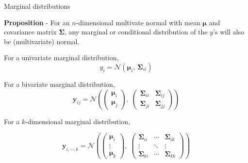 \documentclass[11pt,ignorenonframetext,]{beamer}
\begin{document}
\begin{frame}{Marginal distributions}
\protect\hypertarget{marginal-distributions}{}

\small

\textbf{Proposition} - For an \(n\)-dimensional multivate normal with
mean \(\symbf{\mu}\) and covariance matrix \(\symbf{\Sigma}\), any
marginal or conditional distribution of the \(y\)'s will also be
(multivariate) normal.

\pause

\vspace{2mm}

For a univariate marginal distribution,
\[ y_i = \mathcal{N}(\symbf{\mu}_i,\,\symbf{\Sigma}_{ii}) \]

\pause

For a bivariate marginal distribution,
\[ \symbf{y}_{ij} = \mathcal{N}\left( \begin{pmatrix}\symbf{\mu}_i \\ \symbf{\mu}_j \end{pmatrix},\; \begin{pmatrix} \symbf{\Sigma}_{ii} & \symbf{\Sigma}_{ij} \\ \symbf{\Sigma}_{ji} & \symbf{\Sigma}_{jj} \end{pmatrix} \right) \]

\pause

For a \(k\)-dimensional marginal distribution,

\[ 
\symbf{y}_{i,\cdots,k} = 
  \mathcal{N}\left( 
    \begin{pmatrix}\symbf{\mu}_{i} \\ \vdots \\ \symbf{\mu}_{k} \end{pmatrix},\; 
    \begin{pmatrix} 
      \symbf{\Sigma}_{ii}  & \cdots & \symbf{\Sigma}_{i k} \\ 
      \vdots           & \ddots & \vdots \\
      \symbf{\Sigma}_{k i} & \cdots & \symbf{\Sigma}_{k k} \end{pmatrix} 
  \right) 
\]

\end{frame}
\end{document}
